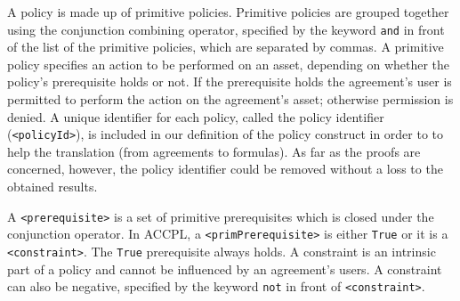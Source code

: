 \documentclass[runningheads,a4paper]{llncs}
\newcommand{\syn}{\texttt}
\begin{document}
A policy is made up of primitive policies. Primitive policies are
grouped together using the conjunction combining operator, specified
by the keyword \syn{and} in front of the list of the primitive
policies, which are separated by commas.  A primitive policy specifies
an action to be performed on an asset, depending on whether the
policy's prerequisite holds or not. If the prerequisite holds the
agreement's user is permitted to perform the action on the agreement's
asset; otherwise permission is denied. A unique identifier for each
policy, called the policy identifier (\syn{<policyId>}), is included
in our definition of the policy construct in order to to help the
translation (from agreements to formulas).  As far as the proofs are
concerned, however, the policy identifier could be removed without a
loss to the obtained results.

A \syn{<prerequisite>} is a set of primitive prerequisites which is
closed under the conjunction operator.  In \ac{ACCPL}, a
\syn{<primPrerequisite>} is either \syn{True} or it is a
\syn{<constraint>}. The \syn{True} prerequisite always holds. A
constraint is an intrinsic part of a policy and cannot be influenced
by an agreement's users. A constraint can also be negative, specified
by the keyword \syn{not} in front of \syn{<constraint>}.
\end{document}
